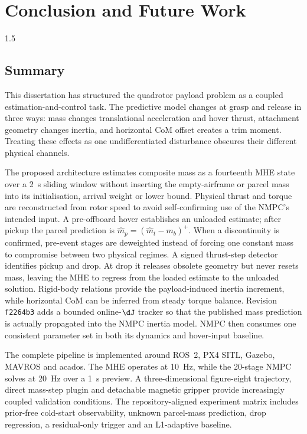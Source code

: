 \chapter{Conclusion and Future Work}
\label{ch:conclusion}
\begin{spacing}{1.5}
\setlength{\parskip}{0.22in}

\section{Summary}

This dissertation has structured the quadrotor payload problem as a coupled estimation-and-control task. The predictive model changes at grasp and release in three ways: mass changes translational acceleration and hover thrust, attachment geometry changes inertia, and horizontal CoM offset creates a trim moment. Treating these effects as one undifferentiated disturbance obscures their different physical channels.

The proposed architecture estimates composite mass as a fourteenth MHE
state over a \SI{2}{s} sliding window without inserting the
empty-airframe or parcel mass into its initialisation, arrival weight or
lower bound. Physical thrust and torque are reconstructed from rotor
speed to avoid self-confirming use of the NMPC's intended input. A
pre-offboard hover establishes an unloaded estimate; after pickup the
parcel prediction is $\hat m_p=(\hat m_t-m_b)^+$. When a
discontinuity is confirmed, pre-event stages are deweighted instead of
forcing one constant mass to compromise between two physical regimes. A
signed thrust-step detector identifies pickup and drop. At drop it
releases obsolete geometry but never resets mass, leaving the MHE to
regress from the loaded estimate to the unloaded solution. Rigid-body
relations provide the payload-induced inertia increment, while horizontal
CoM can be inferred from steady torque balance. Revision \texttt{f2264b3}
adds a bounded online-$\dJ$ tracker so that the published mass prediction
is actually propagated into the NMPC inertia model. NMPC then consumes one
consistent parameter set in both its dynamics and hover-input baseline.

The complete pipeline is implemented around ROS~2, PX4 SITL, Gazebo,
MAVROS and acados. The MHE operates at \SI{10}{Hz}, while the 20-stage
NMPC solves at \SI{20}{Hz} over a \SI{1}{s} preview. A
three-dimensional figure-eight trajectory, direct mass-step plugin and
detachable magnetic gripper provide increasingly coupled validation
conditions. The repository-aligned experiment matrix includes prior-free
cold-start observability, unknown parcel-mass prediction, drop regression,
a residual-only trigger and an L1-adaptive baseline.


\end{spacing}
